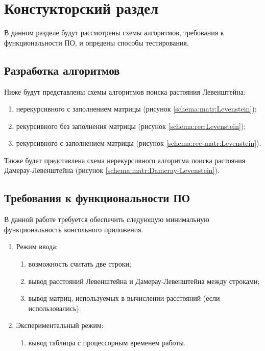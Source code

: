 \chapter{ Констукторский раздел}
\label{cha:design}
    В данном разделе будут рассмотрены схемы алгоритмов, требования к функциональности ПО,
    и опредены способы тестирования.
    
    \section{Разработка алгоритмов}
        Ниже будут представлены схемы алгоритмов поиска растояния Левенштейна: \begin{enumerate}
            \item нерекурсивного с заполнением матрицы (рисунок \ref{schema:matr:Levenstein});
            \item рекурсивного без заполнения матрицы (рисунок \ref{schema:rec:Levenstein});
            \item рекурсивного с заполнением матрицы (рисунок \ref{schema:rec-matr:Levenstein}).
        \end{enumerate}

        Также будет представлена схема нерекурсивного алгоритма поиска растояния Дамерау-Левенштейна (рисунок \ref{schema:matr:Dameray-Levenstein}).

    \section{Требования к функциональности ПО}
        В данной работе требуется обеспечить следующую минимальную функциональность консольного приложения.
        \begin{enumerate}
            \item Режим ввода:
            \begin{enumerate}
                \item возможность считать две строки;
                \item вывод расстояний Левенштейна и Дамерау-Левенштейна между строками;
                \item вывод матриц, используемых в вычислении расстояний (если использовались).
            \end{enumerate}
            \item Экспериментальный режим: 
            \begin{enumerate}
                \item вывод таблицы с процессорным временем \cite{CPU-time} работы.
            \end{enumerate}
        \end{enumerate}
        
